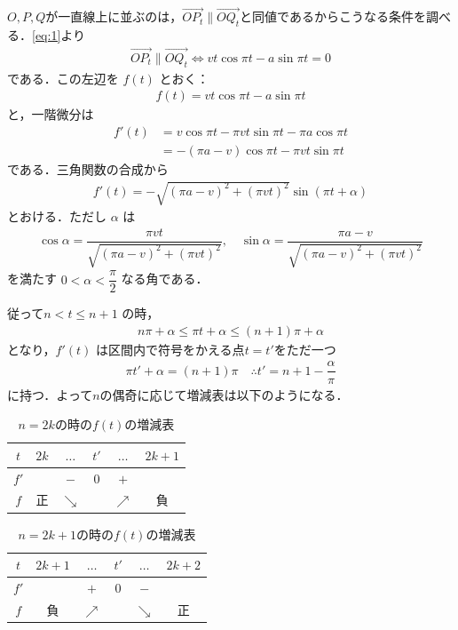 \documentclass[../../main.tex]{subfiles}
\begin{document}
$O,P,Q$が一直線上に並ぶのは，$\overrightarrow{OP_t} \parallel \overrightarrow{O Q_t}$と同値であるからこうなる条件を調べる．\cref{eq:1}より
\begin{align}
  \overrightarrow{OP_t} \parallel \overrightarrow{O Q_t}
  \iff
  v t \cos \pi t - a \sin \pi t = 0 \label{eq:2}
\end{align}
である．この左辺を $f(t)$ とおく：
\begin{align}
  f(t) = v t \cos \pi t - a \sin \pi t \label{eq:3}
\end{align}
と，一階微分は
\begin{align}
  f'(t)
  & = v \cos \pi t - \pi v t \sin \pi t - \pi a \cos \pi t \\
  & = -(\pi a - v) \cos \pi t - \pi v t \sin \pi t \label{eq:4}
\end{align}
である．三角関数の合成から
\begin{align}
  f'(t) = -\sqrt{(\pi a - v)^2 + (\pi v t)^2} \sin(\pi t + \alpha) \label{eq:5}
\end{align}
とおける．ただし $\alpha$ は
\begin{align}
  \cos \alpha = \dfrac{\pi v t}{\sqrt{(\pi a - v)^2 + (\pi v t)^2}}, \quad
  \sin \alpha = \dfrac{\pi a - v}{\sqrt{(\pi a - v)^2 + (\pi v t)^2}} \label{eq:6}
\end{align}
を満たす $0 < \alpha < \dfrac{\pi}{2}$ なる角である．

従って$n < t \le n+1$ の時，
\begin{align}
  n\pi + \alpha \le \pi t + \alpha \le (n+1)\pi + \alpha
\end{align}
となり，$f'(t)$ は区間内で符号をかえる点$t=t'$をただ一つ
\begin{align}
  \pi t' + \alpha = (n+1)\pi
  \quad \therefore
  t' = n+1 - \dfrac{\alpha}{\pi} \label{eq:7}
\end{align}
に持つ．よって$n$の偶奇に応じて増減表は以下のようになる．

\begin{table}[htb]
  \centering
  \caption{$n=2k$の時の$f(t)$の増減表}
  \begin{tabular}{c|c|c|c|c|c}
    $t$ & $2k$ & $\dots$ & $t'$ & $\dots$ & $2k+1$ \\ \hline
    $f'$ & & $-$ & $0$ & $+$ & \\ \hline
    $f$ & 正 & $\searrow$ & & $\nearrow$ & 負
  \end{tabular}
\end{table}

\begin{table}[htb]
  \centering
  \caption{$n=2k+1$の時の$f(t)$の増減表}
  \begin{tabular}{c|c|c|c|c|c}
    $t$ & $2k+1$ & $\dots$ & $t'$ & $\dots$ & $2k+2$ \\ \hline
    $f'$ & & $+$ & $0$ & $-$ & \\ \hline
    $f$ & 負 & $\nearrow$ & & $\searrow$ & 正
  \end{tabular}
\end{table}
\end{document}
